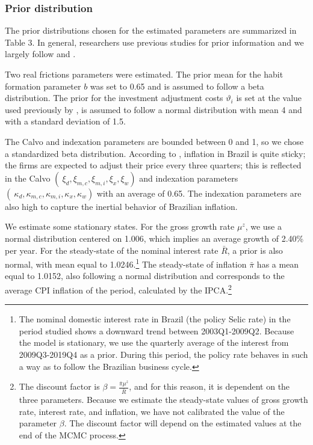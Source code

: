 \documentclass[12pt,oneside,a4paper]{article}
\begin{document}
\subsubsection{Prior distribution}
The prior distributions chosen for the estimated parameters are summarized in Table 3. In general, researchers use previous studies for prior information and we largely follow \citet{Castro:2015} and \citet{Adolfson:2007}.

Two real frictions parameters were estimated. The prior mean for the habit formation parameter $b$ was set to 0.65 and is assumed to follow a beta distribution. The prior for the investment adjustment costs $\vartheta_{i}$ is set at the value used previously by \citet{Castro:2015}, is assumed to follow a normal distribution with mean 4 and with a standard deviation of 1.5.

The Calvo and indexation parameters are bounded between 0 and 1, so we chose a standardized beta distribution. According to \citet{Castro:2015}, inflation in Brazil is quite sticky; the firms are expected to adjust
their price every three quarters; this is reflected in the Calvo $\left(\ \xi_d, \xi_{m,c}, \xi_{m,i}, \xi_{x}, \xi_{w} \right) $ and indexation parameters $\left(\ \kappa_d, \kappa_{m,c}, \kappa_{m,i}, \kappa_{x}, \kappa_{w} \right) $   with an average of 0.65. The indexation parameters are also high to capture the inertial behavior of Brazilian inflation.

We estimate some stationary states. For the gross growth rate $\mu^{z}$, we use a normal distribution centered on 1.006, which implies an average growth of 2.40\% per year. For the steady-state of the nominal interest rate $\bar{R}$, a prior is also normal, with mean  equal to 1.0246.\footnote{The nominal domestic interest rate in Brazil (the policy Selic rate) in the period studied shows a downward trend between 2003Q1-2009Q2. Because the model is stationary, we use the quarterly average of the interest from 2009Q3-2019Q4 as a prior. During this period, the policy rate behaves in such a way as to follow the Brazilian business cycle.} The steady-state of inflation $\bar{\pi}$ has a mean equal to 1.0152, also following a normal distribution and corresponds to the average CPI inflation of the period, calculated by the IPCA.\footnote{The discount factor is $\beta = \frac{\bar{\pi} \mu^{z}}{\bar{R}} $, and for this reason, it is dependent on the three parameters. Because we estimate the steady-state values of gross growth rate, interest rate, and inflation, we have not calibrated the value of the parameter $\beta$. The discount factor will depend on the estimated values at the end of the MCMC process.}
\end{document}
